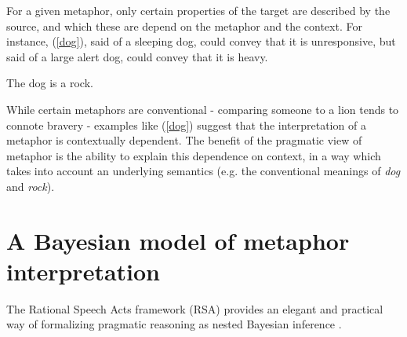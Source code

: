 \documentclass[9pt,twocolumn,twoside,lineno]{pnas-new}
\begin{document}
	For a given metaphor, only certain properties of the target are described by the source, and which these are depend on the metaphor and the context. For instance, (\ref{dog}), said of a sleeping dog, could convey that it is unresponsive, but said of a large alert dog, could convey that it is heavy.


	\begin{examples}
	\item The dog is a rock. \label{dog}
	\end{examples}

	While certain metaphors are conventional - comparing someone to a lion tends to connote bravery - examples like (\ref{dog}) suggest that the interpretation of a metaphor is contextually dependent. The benefit of the pragmatic view of metaphor is the ability to explain this dependence on context, in a way which takes into account an underlying semantics (e.g. the conventional meanings of \emph{dog} and \emph{rock}).
	
\section{A Bayesian model of metaphor interpretation} \label{rsa}
	
	The Rational Speech Acts framework (RSA) provides an elegant and practical way of formalizing pragmatic reasoning as nested Bayesian inference \cite{frank2012predicting}.
\end{document}
